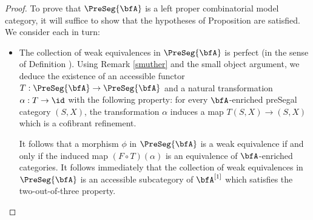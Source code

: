 \begin{proof}
To prove that $\PreSeg{\bfA}$ is a left proper combinatorial model category, it will suffice to show that
the hypotheses of Proposition  are satisfied. We consider each in turn:
\begin{itemize}
\item[$(1)$] The collection of weak equivalences in $\PreSeg{\bfA}$ is perfect (in the sense of
Definition ). Using Remark \ref{smuther} and the small object argument, we deduce the
existence of an accessible functor $T: \PreSeg{\bfA} \rightarrow \PreSeg{\bfA}$ and a natural transformation
$\alpha: T \rightarrow \id$ with the following property: for every $\bfA$-enriched preSegal category $(S,X)$, the transformation $\alpha$ induces a map $T(S,X) \rightarrow (S,X)$ which is a cofibrant refinement.

It follows that a morphism $\phi$ in $\PreSeg{\bfA}$ is a weak equivalence if and only if the induced map
$(F \circ T)(\alpha)$ is an equivalence of $\bfA$-enriched categories. It follows immediately that
the collection of weak equivalences in $\PreSeg{\bfA}$ is an accessible subcategory of $\bfA^{[1]}$ which satisfies the two-out-of-three property.


\end{itemize}
\end{proof}
